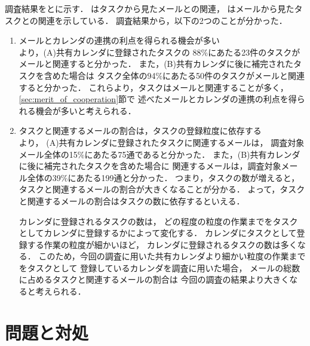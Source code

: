 \documentclass[submit,techreq,noauthor,dvipdfmx]{ipsj}
\begin{document}
調査結果をとに示す．
はタスクから見たメールとの関連，
はメールから見たタスクとの関連を示している．
調査結果から，以下の2つのことが分かった．
\begin{enumerate}

\item メールとカレンダの連携の利点を得られる機会が多い\\
より，(A)共有カレンダに登録されたタスクの
88\%にあたる23件のタスクがメールと関連すると分かった．
また，(B)共有カレンダに後に補完されたタスクを含めた場合は
タスク全体の94\%にあたる50件のタスクがメールと関連すると分かった．
これらより，タスクはメールと関連することが多く，\ref{sec:merit_of_cooperation}節で
述べたメールとカレンダの連携の利点を得られる機会が多いと考えられる．

\item タスクと関連するメールの割合は，タスクの登録粒度に依存する\\
より，
(A)共有カレンダに登録されたタスクに関連するメールは，
調査対象メール全体の15\%にあたる75通であると分かった．
また，(B)共有カレンダに後に補完されたタスクを含めた場合に
関連するメールは，調査対象メール全体の39\%にあたる199通と分かった．
つまり，タスクの数が増えると，タスクと関連するメールの割合が大きくなることが分かる．
よって，タスクと関連するメールの割合はタスクの数に依存するといえる．

カレンダに登録されるタスクの数は，
どの程度の粒度の作業までをタスクとしてカレンダに登録するかによって変化する．
カレンダにタスクとして登録する作業の粒度が細かいほど，
カレンダに登録されるタスクの数は多くなる．
このため，今回の調査に用いた共有カレンダより細かい粒度の作業までをタスクとして
登録しているカレンダを調査に用いた場合，
メールの総数に占めるタスクと関連するメールの割合は
今回の調査の結果より大きくなると考えられる．

\end{enumerate}


\section{問題と対処}\label{chap:problem_and_solution}

\end{document}
